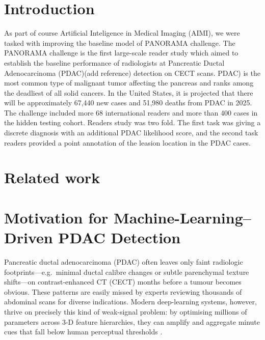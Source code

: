 \documentclass[conference]{IEEEtran}
\begin{document}
\section{Introduction}
As part of course Artificial Inteligence in Medical Imaging (AIMI)\cite{b4}, we were tasked with improving the baseline model of \textsc{PANORAMA}\cite{b5} challenge. The PANORAMA challenge is the first large-scale reader study which aimed to establish the baseline performance of radiologists at Pancreatic Ductal Adenocarcinoma (PDAC)(add reference) detection on CECT scans. PDAC) is the most common type of malignant tumor affecting the pancreas and ranks among the deadliest of all solid cancers. In the United States, it is projected that there will be approximately 67,440 new cases and 51,980 deaths from PDAC in 2025\cite{b2}.
The challenge included more  68 international readers and more than 400 cases in the hidden testing cohort. Readers study was two fold. The first task was giving a discrete diagnosis with an additional PDAC likelihood score, and the second task readers provided a point annotation of the leasion location in the PDAC cases.

\section{Related work}
\section{Motivation for Machine-Learning–Driven PDAC Detection}
Pancreatic ductal adenocarcinoma (PDAC) often leaves only faint radiologic footprints—e.g.\ minimal ductal calibre changes or subtle parenchymal texture shifts—on contrast-enhanced CT (CECT) months before a tumour becomes obvious.  These patterns are easily missed by experts reviewing thousands of abdominal scans for diverse indications.  Modern deep-learning systems, however, thrive on precisely this kind of weak-signal problem: by optimising millions of parameters across 3-D feature hierarchies, they can amplify and aggregate minute cues that fall below human perceptual thresholds \cite{Esteva2017,McKinney2020}.
\end{document}
